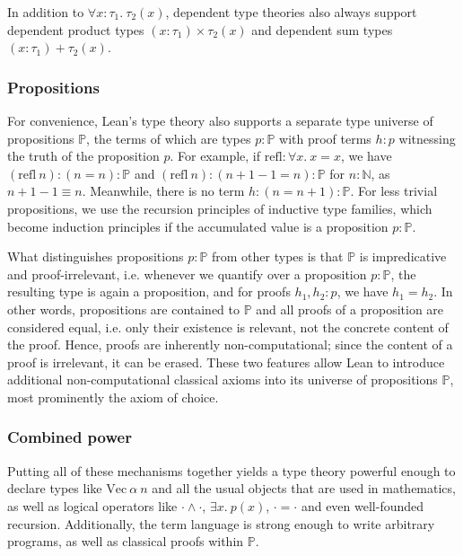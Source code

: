 In addition to $\forall x : \tau_1.\ \tau_2(x)$, dependent type theories also always support dependent product types $(x : \tau_1) \times \tau_2(x)$ and dependent sum types $(x : \tau_1) + \tau_2(x)$.

\subsubsection{Propositions}
For convenience, Lean's type theory also supports a separate type universe of propositions $\mathbb{P}$, the terms of which are types $p : \mathbb{P}$ with proof terms $h : p$ witnessing the truth of the proposition $p$. For example, if $\mathrm{refl} : \forall x.\ x = x$, we have $(\mathrm{refl}\ n) : (n = n) : \mathbb{P}$ and $(\mathrm{refl}\ n) : (n + 1 - 1 = n) : \mathbb{P}$ for $n : \mathbb{N}$, as $n + 1 - 1 \equiv n$. Meanwhile, there is no term $h : (n = n + 1) : \mathbb{P}$. For less trivial propositions, we use the recursion principles of inductive type families, which become induction principles if the accumulated value is a proposition $p : \mathbb{P}$. 

What distinguishes propositions $p : \mathbb{P}$ from other types is that $\mathbb{P}$ is impredicative and proof-irrelevant, i.e. whenever we quantify over a proposition $p : \mathbb{P}$, the resulting type is again a proposition, and for proofs $h_1, h_2 : p$, we have $h_1 = h_2$. In other words, propositions are contained to $\mathbb{P}$ and all proofs of a proposition are considered equal, i.e. only their existence is relevant, not the concrete content of the proof. Hence, proofs are inherently non-computational; since the content of a proof is irrelevant, it can be erased. These two features allow Lean to introduce additional non-computational classical axioms into its universe of propositions $\mathbb{P}$, most prominently the axiom of choice.

\subsubsection{Combined power}
Putting all of these mechanisms together yields a type theory powerful enough to declare types like $\mathrm{Vec}\ \alpha\ n$ and all the usual objects that are used in mathematics, as well as logical operators like $\cdot \land \cdot$, $\exists x.\ p(x)$, $\cdot = \cdot$ and even well-founded recursion. Additionally, the term language is strong enough to write arbitrary programs, as well as classical proofs within $\mathbb{P}$.

